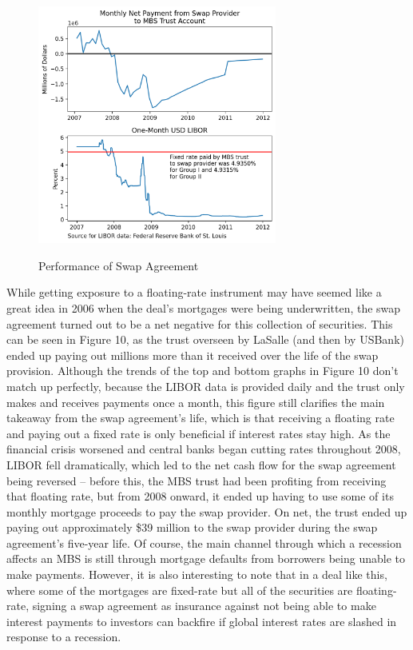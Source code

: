 \documentclass[12pt]{article}
\begin{document}
\begin{figure}[h]
	\centering
	\caption{Performance of Swap Agreement}
	\includegraphics[width=0.7\textwidth]{../figures/timeseries_swap_performance}
	\label{fig:timeseries_swap_performance}
\end{figure}

While getting exposure to a floating-rate instrument may have seemed like a great idea in 2006 when the deal’s mortgages were being underwritten, the swap agreement turned out to be a net negative for this collection of securities. This can be seen in Figure 10, as the trust overseen by LaSalle (and then by USBank) ended up paying out millions more than it received over the life of the swap provision. Although the trends of the top and bottom graphs in Figure 10 don’t match up perfectly, because the LIBOR data is provided daily and the trust only makes and receives payments once a month, this figure still clarifies the main takeaway from the swap agreement’s life, which is that receiving a floating rate and paying out a fixed rate is only beneficial if interest rates stay high. As the financial crisis worsened and central banks began cutting rates throughout 2008, LIBOR fell dramatically, which led to the net cash flow for the swap agreement being reversed – before this, the MBS trust had been profiting from receiving that floating rate, but from 2008 onward, it ended up having to use some of its monthly mortgage proceeds to pay the swap provider. On net, the trust ended up paying out approximately \$39 million to the swap provider during the swap agreement’s five-year life. Of course, the main channel through which a recession affects an MBS is still through mortgage defaults from borrowers being unable to make payments. However, it is also interesting to note that in a deal like this, where some of the mortgages are fixed-rate but all of the securities are floating-rate, signing a swap agreement as insurance against not being able to make interest payments to investors can backfire if global interest rates are slashed in response to a recession.
\end{document}
